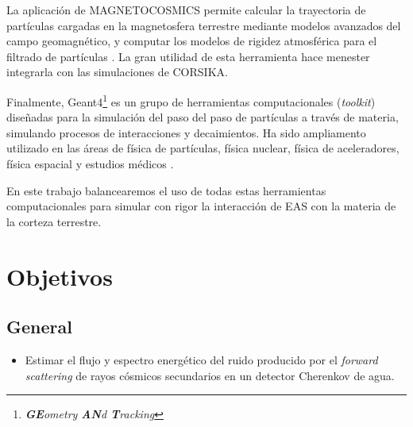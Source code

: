 \documentclass[12pt]{report}
\begin{document}
La aplicación de MAGNETOCOSMICS permite calcular la trayectoria de partículas cargadas en la magnetosfera terrestre mediante modelos avanzados del campo geomagnético, y computar los modelos de rigidez atmosférica para el filtrado de partículas \cite{magnetocosmics}. La gran utilidad de esta herramienta hace menester integrarla con las simulaciones de CORSIKA.

Finalmente, Geant4\footnote{\textit{\textbf{GE}ometry \textbf{AN}d \textbf{T}racking}} es un grupo de herramientas computacionales (\textit{toolkit}) diseñadas para la simulación del paso del paso de partículas a través de materia, simulando procesos de interacciones y decaimientos. Ha sido ampliamento utilizado en las áreas de física de partículas, física nuclear, física de aceleradores, física espacial y estudios médicos \cite{agostinelli2003geant4}.

En este trabajo balancearemos el uso de todas estas herramientas computacionales para simular con rigor la interacción de EAS con la materia de la corteza terrestre.


















\section*{Objetivos}

\subsection*{General}
\begin{itemize}
    \item Estimar el flujo y espectro energético del ruido producido por el \textit{forward scattering} de rayos cósmicos secundarios en un detector Cherenkov de agua.
\end{itemize}
\end{document}
